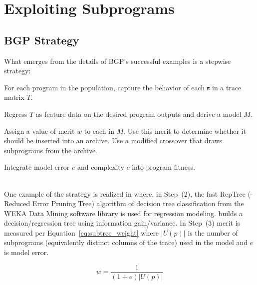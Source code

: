 \section{Exploiting Subprograms}\label{sect:foreground}
\subsection{BGP Strategy}
What emerges from the details of BGP's successful examples is a stepwise strategy:  
\begin{inparaenum}

\item For each program in the population, capture the behavior of each \st{s} in a trace matrix $T$.

\item  Regress $T$ as feature data on the desired program outputs and derive a model $M$. 

\item Assign a value of merit $w$ to each \st in $M$. Use this merit to determine whether it should be inserted into an archive. Use a modified crossover that draws subprograms from the archive. 

\item Integrate model error $e$ and complexity $c$ into program fitness.
\end{inparaenum} \\


One example of the strategy is realized in \cite{krawiecGecco2014} where, in Step~(2), the fast RepTree (\REPTREE - Reduced  Error  Pruning  Tree) algorithm  of decision tree classification from the WEKA Data Mining software library\cite{Hall:2009:WDM:1656274.1656278} is used for regression modeling.  \REPTREE builds a decision/regression tree using information gain/variance. In Step~(3) merit is measured per Equation~\ref{eq:subtree_weight} where $|U(p)|$ is the number of subprograms (equivalently distinct columns of the trace) used in the model and $e$ is model error.


\begin{equation}
\label{eq:subtree_weight}
w = \frac{1}{(1 + e)|U(p)|}
\end{equation}

